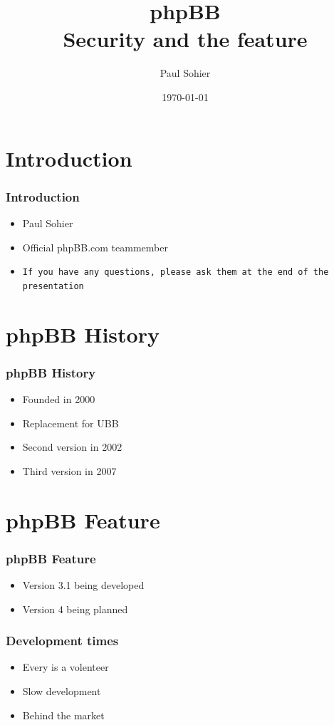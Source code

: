 \documentclass{beamer}
\title{phpBB\\Security and the feature}
\author{Paul Sohier}
\date{\today}
\begin{document}
\frame{
  \titlepage
} 

 \section{Introduction}
 \begin{frame}
   \frametitle{Introduction}
   \begin{itemize}
    \item<1-> Paul Sohier
    \item<1-> Official phpBB.com teammember
    \item<1-> \texttt{If you have any questions, please ask them at the end of the presentation}
   \end{itemize}
\end{frame}


\section{phpBB History}
\begin{frame}
  \frametitle{phpBB History}
  \begin{itemize}
    \item Founded in 2000
    \item Replacement for UBB
    \item Second version in 2002
    \item Third version in 2007
  \end{itemize}
\end{frame}

\section{phpBB Feature}
\begin{frame}
  \frametitle{phpBB Feature}
  \begin{itemize}
    \item Version 3.1 being developed
    \item Version 4 being planned
  \end{itemize}
\end{frame}

\begin{frame}
  \frametitle{Development times}
  \begin{itemize}
    \item Every is a volenteer
    \item Slow development
    \item Behind the market
  \end{itemize}
\end{frame}
\end{document}
